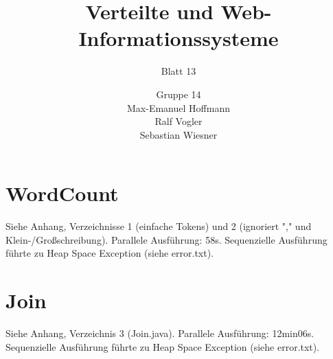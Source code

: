 \documentclass[11pt,a4paper]{scrartcl}
\begin{document}
\author{Gruppe 14\\Max-Emanuel Hoffmann\\Ralf Vogler\\Sebastian Wiesner}
\title{Verteilte und Web-Informationssysteme}
\subtitle{Blatt 13}

\maketitle

\section{WordCount}
Siehe Anhang, Verzeichnisse 1 (einfache Tokens) und 2 (ignoriert "," und Klein-/Großschreibung).
Parallele Ausführung: 58s.
Sequenzielle Ausführung führte zu Heap Space Exception (siehe error.txt).

\section{Join}
Siehe Anhang, Verzeichnis 3 (Join.java).
Parallele Ausführung: 12min06s.
Sequenzielle Ausführung führte zu Heap Space Exception (siehe error.txt).
\end{document}
